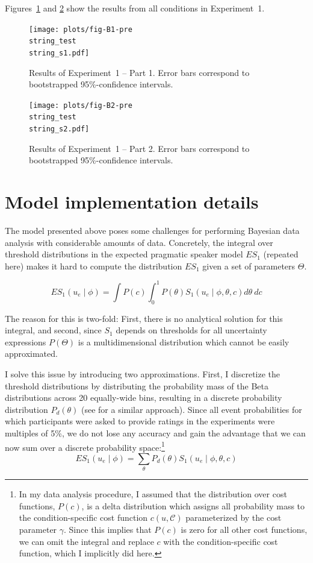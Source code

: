 Figures~\ref{fig:norming-results-1} and \ref{fig:norming-results-2} show the results from all conditions in Experiment~1. 

\begin{figure}[h!]
\texttt{[image: plots/fig-B1-pre\\string\_test\\string\_s1.pdf]}
\caption{Results of Experiment~1 -- Part 1. Error bars correspond to bootstrapped 95\%-confidence intervals. \label{fig:norming-results-1}}
\end{figure}

\begin{figure}[h!]
\texttt{[image: plots/fig-B2-pre\\string\_test\\string\_s2.pdf]}
\caption{Results of Experiment~1  -- Part 2. Error bars correspond to bootstrapped 95\%-confidence intervals. \label{fig:norming-results-2}}
\vspace{4cm}

\end{figure}


\chapter{Model implementation details}

The model presented above poses some challenges for performing Bayesian data analysis with considerable amounts of data. 
Concretely, the integral over threshold distributions in the expected pragmatic speaker model $ES_1$ (repeated here) makes it hard to compute 
the distribution $ES_1$ given a set of parameters $\Theta$.

$$ES_1\left(u_e \mid \phi \right) = \int P(c) \int_0^1 P(\theta) S_1\left(u _e\mid \phi, \theta, c\right) d\theta \  d c$$

The reason for this is two-fold: First, there is no analytical solution for this integral, and second, since $S_1$ depends on
thresholds for all uncertainty expressions $P(\Theta)$ is a multidimensional distribution which cannot be easily approximated.

I solve this issue by introducing two approximations. First, I discretize the threshold distributions by distributing the probability mass
of the Beta distributions across 20 equally-wide bins, resulting in a discrete probability distribution $P_{d}(\theta)$ (see \cite{Tessler2019} for a similar approach). Since all event probabilities for which participants were asked to provide ratings in the
experiments were multiples of 5\%, we do not lose any accuracy and gain the advantage that we can now sum over a discrete probability space:\footnote{In my data analysis procedure, I assumed that the 
distribution over cost functions, $P(c)$, is a delta distribution which assigns all probability mass to the condition-specific cost function 
$c(u, \mathscr{C})$ parameterized by the cost parameter $\gamma$. Since this implies that $P(c)$ is zero for all other cost functions, we can omit the integral and replace $c$ 
with the condition-specific cost function, which I implicitly did here.}
$$ES_1\left(u_e \mid \phi \right) = \sum_{\theta} P_{d}(\theta) S_1\left(u _e\mid \phi, \theta, c\right)$$

